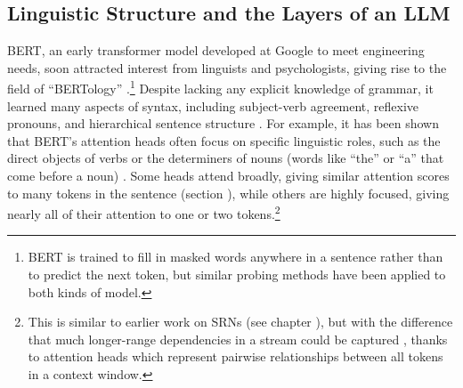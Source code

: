 
\subsection{Linguistic Structure and the Layers of an LLM}\label{llmLinguisticStructure}

BERT, an early transformer model developed at Google to meet engineering
needs, soon attracted interest from linguists and psychologists, giving rise to
the field of ``BERTology'' \cite{rogers2020primer}.\footnote{BERT is trained
to fill in masked words anywhere in a sentence rather than to predict the next
token, but similar probing methods have been applied to both kinds of model.}
Despite lacking any explicit
knowledge of grammar, it learned many aspects of syntax, including subject-verb
agreement, reflexive pronouns, and hierarchical sentence structure
\cite{goldberg2019assessing, linzen2021syntactic, tenney2019bert}. For example,
it has been shown that BERT's attention heads often focus on specific
linguistic roles, such as the direct objects of verbs or the determiners of
nouns (words like ``the'' or ``a'' that come before a noun) \cite{clark2019does}. Some heads attend broadly, giving similar attention
scores to many tokens in the sentence (section ), while
others are highly focused, giving nearly all of their attention to one or two
tokens.\footnote{This is similar to earlier work on SRNs (see chapter
), but with the difference that much
longer-range dependencies in a stream could be captured
\cite{mcclelland2020placing}, thanks to attention heads which represent
pairwise relationships between all tokens in a context window.}

